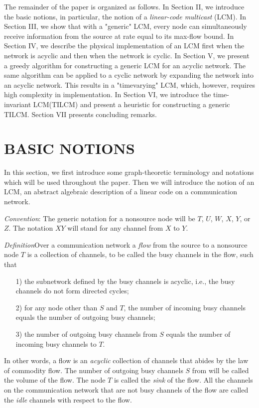 \documentclass{IEEEtran}
\begin{document}
The remainder of the paper is organized as follows. In Section II, we introduce the basic notions, in particular, the notion of a \emph{linear-code multicast} (LCM). In Section III, we show that with a "generic" LCM, every node can simultaneously receive information from the source at rate equal to its max-flow bound. In Section IV, we describe the physical implementation of an LCM first when the network is acyclic and then when the network is cyclic. In Section V, we present a greedy algorithm for constructing a generic LCM for an acyclic network. The same algorithm can be applied to a cyclic network by expanding the network into an acyclic network. This results in a "timevarying" LCM, which, however, requires high complexity in implementation. In Section VI, we introduce the time-invariant LCM(TILCM) and present a heuristic for constructing a generic TILCM. Section VII presents concluding remarks.

\section{BASIC NOTIONS}\label{sec:basic}
\par
In this section, we first introduce some graph-theoretic terminology and notations which will be used throughout the paper. Then we will introduce the notion of an LCM, an abstract algebraic description of a linear code on a communication network.
\par
\emph{Convention}: The generic notation for a nonsource node will be $T$, $U$, $W$, $X$, $Y$, or $Z$. The notation $XY$ will stand for any channel from $X$ to $Y$.
\par
\emph{Definition}Over a communication network a \emph{flow} from the source to a nonsource node $T$ is a collection of channels, to be called the busy channels in the flow, such that
\begin{itemize}
	\item[1)] the subnetwork defined by the busy channels is acyclic, i.e., the busy channels do not form directed cycles;
	\item[2)] for any node other than $S$ and $T$, the number of incoming busy channels equals the number of outgoing 	busy channels;
	\item[3)] the number of outgoing busy channels from $S$ equals the number of incoming busy channels to $T$.
\end{itemize}
\par
In other words, a flow is an \emph{acyclic} collection of channels that abides by the law of commodity flow. The number of outgoing busy channels $S$ from will be called the volume of the flow. The node $T$ is called the \emph{sink} of the flow. All the channels on the communication network that are not busy channels of the flow are called the \emph{idle} channels with respect to the flow.
\end{document}
